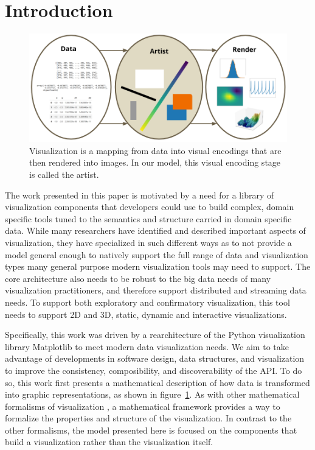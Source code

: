 \documentclass[../main.tex]{subfiles}
\begin{document}
\section{Introduction}
\label{sec:intro}
\begin{figure}[H]
    \includegraphics[width=\textwidth]{figures/intro/dar.png}
    \caption{Visualization is a mapping from data into visual encodings that are then rendered into images. In our model, this visual encoding stage is called the artist.}
    \label{fig:intro_artist_stages}
\end{figure}
The work presented in this paper is motivated by a need for a library of visualization components that developers could use to build complex, domain specific tools tuned to the semantics and structure carried in domain specific data. While many researchers have identified and described important aspects of visualization, they have specialized in such different ways as to not provide a model general enough to natively support the full range of data and visualization types many general purpose modern visualization tools may need to support. The core architecture also needs to be robust to the big data needs of many visualization practitioners, and therefore support distributed and streaming data needs. To support both exploratory and confirmatory visualization\cite{tukeyWeNeedBoth1980}, this tool needs to support 2D and 3D, static, dynamic and interactive visualizations. 

Specifically, this work was driven by a rearchitecture of the Python visualization library Matplotlib\cite{hunterMatplotlib2DGraphics2007} to meet modern data visualization needs. We aim to take advantage of developments in software design, data structures, and visualization to improve the consistency, composibility, and discoverability of the API. To do so, this work first presents a mathematical description of how data is transformed into graphic representations, as shown in figure~\ref{fig:intro_artist_stages}. As with other mathematical formalisms of visualization \cite{mackinlayAutomatingDesignGraphical1986,kindlmann2014algebraic,sugibuchiFramwork2009,vickersUnderstandingViz2013}, a mathematical framework provides a way to formalize the properties and structure of the visualization. In contrast to the other formalisms, the model presented here is focused on the components that build a visualization rather than the visualization itself. 
\end{document}
